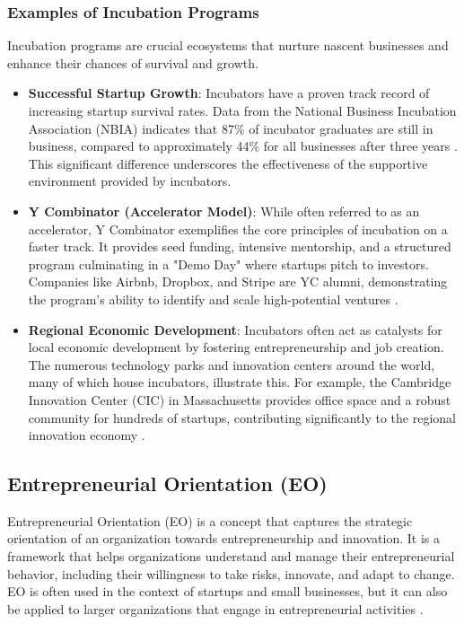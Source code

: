 \documentclass[../Main.tex]{subfiles}
\begin{document}
\subsubsection*{Examples of Incubation Programs}
Incubation programs are crucial ecosystems that nurture nascent businesses and enhance their chances of survival and growth.
\begin{itemize}
    \item \textbf{Successful Startup Growth}: Incubators have a proven track record of increasing startup survival rates. Data from the National Business Incubation Association (NBIA) indicates that 87\% of incubator graduates are still in business, compared to approximately 44\% for all businesses after three years \cite{NBIA2012}. This significant difference underscores the effectiveness of the supportive environment provided by incubators.
    \item \textbf{Y Combinator (Accelerator Model)}: While often referred to as an accelerator, Y Combinator exemplifies the core principles of incubation on a faster track. It provides seed funding, intensive mentorship, and a structured program culminating in a "Demo Day" where startups pitch to investors. Companies like Airbnb, Dropbox, and Stripe are YC alumni, demonstrating the program's ability to identify and scale high-potential ventures \cite{YCombinator2024}.
    \item \textbf{Regional Economic Development}: Incubators often act as catalysts for local economic development by fostering entrepreneurship and job creation. The numerous technology parks and innovation centers around the world, many of which house incubators, illustrate this. For example, the Cambridge Innovation Center (CIC) in Massachusetts provides office space and a robust community for hundreds of startups, contributing significantly to the regional innovation economy \cite{CIC2024}.
\end{itemize}

\subsection{Entrepreneurial Orientation (EO)}
Entrepreneurial Orientation (EO) is a concept that captures the strategic orientation of an organization towards entrepreneurship and innovation. It is a framework that helps organizations understand and manage their entrepreneurial behavior, including their willingness to take risks, innovate, and adapt to change. EO is often used in the context of startups and small businesses, but it can also be applied to larger organizations that engage in entrepreneurial activities \cite{wiklund2005entrepreneurial}.
\end{document}
